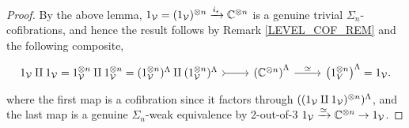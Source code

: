 \documentclass[a4paper,10pt
,draft
]{article}%
\renewcommand{\1}{\eta}%
\begin{document}
\begin{proof}
      By the above lemma,
      $1_{\mathcal V} = (1_{\mathcal V})^{\otimes n} \xrightarrow{i_\epsilon} \mathbb C^{\otimes n}$
      is a genuine trivial $\Sigma_n$-cofibrations,
      and hence the result follows by Remark \ref{LEVEL_COF_REM} and the following composite,
      \[
            \begin{tikzcd}
                  1_\V \amalg 1_\V
                  =
                  1_\V^{\otimes n} \amalg 1_\V^{\otimes n}
                  =
                  (1_\V^{\otimes n})^{\Lambda} \amalg (1_\V^{\otimes n})^{\Lambda}
                  \arrow[r, tail]
                  &
                  \left(\mathbb C^{\otimes n}\right)^\Lambda
                  \arrow[r, "\simeq"]
                  &
                  \left(1_V^{\otimes n}\right)^\Lambda = 1_\V.
            \end{tikzcd}
      \]
      where the first map is a cofibration since it factors through $((1_{\mathcal V} \amalg 1_{\mathcal V})^{\otimes n})^\Lambda$,
      and the last map is a genuine $\Sigma_n$-weak equivalence by 2-out-of-3 $1_{\mathcal V} \xrightarrow{\simeq} \mathbb C^{\otimes n} \to 1_{\mathcal V}$.


      

\end{proof}
\end{document}
